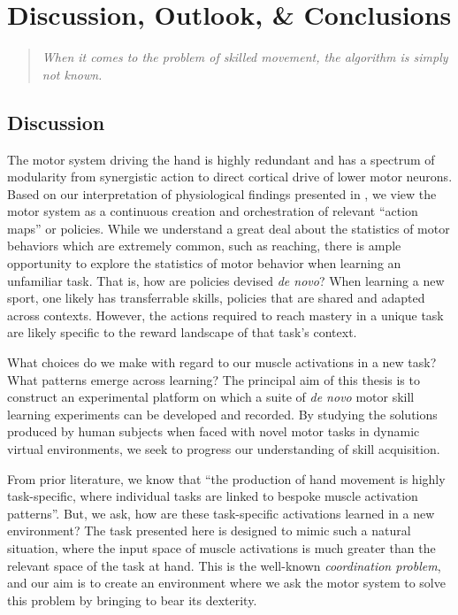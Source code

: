 \documentclass[../main.tex]{subfiles}
\begin{document}
\chapter{Discussion, Outlook, \& Conclusions}\label{chap:conclusion}


\begin{quote}
    \raggedright{\emph{When it comes to the problem of skilled movement, the algorithm is simply not known.}}\\ 
\end{quote}


\cleardoublepage%

\section{Discussion} %



The motor system driving the hand is highly redundant and has a spectrum of modularity from synergistic action to direct cortical drive of lower motor neurons. Based on our interpretation of physiological findings presented in , we view the motor system as a continuous creation and orchestration of relevant ``action maps'' or policies. While we understand a great deal about the statistics of motor behaviors which are extremely common, such as reaching, there is ample opportunity to explore the statistics of motor behavior when learning an unfamiliar task. That is, how are policies devised \textit{de novo}? When learning a new sport, one likely has transferrable skills, policies that are shared and adapted across contexts. However, the actions required to reach mastery in a unique task are likely specific to the reward landscape of that task's context.


What choices do we make with regard to our muscle activations in a new task? What patterns emerge across learning? The principal aim of this thesis is to construct an experimental platform on which a suite of \textit{de novo} motor skill learning experiments can be developed and recorded. By studying the solutions produced by human subjects when faced with novel motor tasks in dynamic virtual environments, we seek to progress our understanding of skill acquisition. 

From prior literature, we know that ``the production of hand movement is highly task-specific, where individual tasks are linked to bespoke muscle activation patterns''\cite{yanUnexpectedComplexityEveryday2020}. But, we ask, how are these task-specific activations learned in a new environment? The task presented here is designed to mimic such a natural situation, where the input space of muscle activations is much greater than the relevant space of the task at hand. This is the well-known \textit{coordination problem}, and our aim is to create an environment where we ask the motor system to solve this problem by bringing to bear its dexterity.
\end{document}
